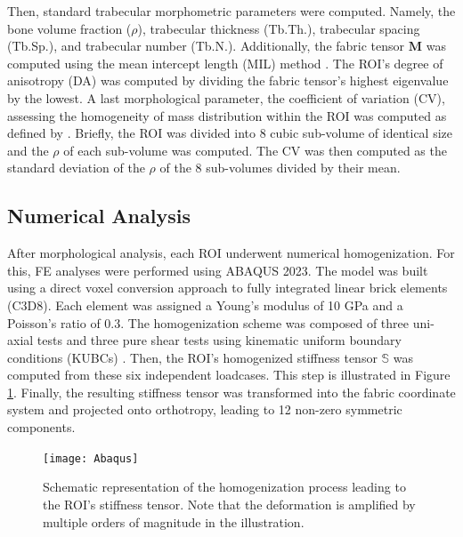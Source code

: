 \documentclass[a4paper,fleqn]{DC_ArtStyle}
\begin{document}
	Then, standard trabecular morphometric parameters were computed.
	Namely, the bone volume fraction ($\rho$), trabecular thickness (Tb.Th.), trabecular spacing (Tb.Sp.), and trabecular number (Tb.N.).
	Additionally, the fabric tensor $\mathbf{M}$ was computed using the mean intercept length (MIL) method \cite{Moreno2014}.
	The ROI's degree of anisotropy (DA) was computed by dividing the fabric tensor's highest eigenvalue by the lowest.
	A last morphological parameter, the coefficient of variation (CV), assessing the homogeneity of mass distribution within the ROI was computed as defined by \citeauthor{Panyasantisuk2015} \cite{Panyasantisuk2015}.
	Briefly, the ROI was divided into 8 cubic sub-volume of identical size and the $\rho$ of each sub-volume was computed.
	The CV was then computed as the standard deviation of the $\rho$ of the 8 sub-volumes divided by their mean.

	\subsection{Numerical Analysis}
	After morphological analysis, each ROI underwent numerical homogenization.
	For this, \textmu FE analyses were performed using ABAQUS 2023.
	The model was built using a direct voxel conversion approach to fully integrated linear brick elements (C3D8).
	Each element was assigned a Young's modulus of 10 GPa and a Poisson's ratio of 0.3.
	The homogenization scheme was composed of three uni-axial tests and three pure shear tests using kinematic uniform boundary conditions (KUBCs) \cite{Panyasantisuk2015}.
	Then, the ROI's homogenized stiffness tensor $\mathbb{S}$ was computed from these six independent loadcases.
	This step is illustrated in Figure \ref{FigHomogenization}.
	Finally, the resulting stiffness tensor was transformed into the fabric coordinate system and projected onto orthotropy, leading to 12 non-zero symmetric components.

	\begin{figure}
		\texttt{[image: Abaqus]}
		\caption{Schematic representation of the homogenization process leading to the ROI's stiffness tensor.
				 Note that the deformation is amplified by multiple orders of magnitude in the illustration.}
		\label{FigHomogenization}
	\end{figure}
\end{document}
